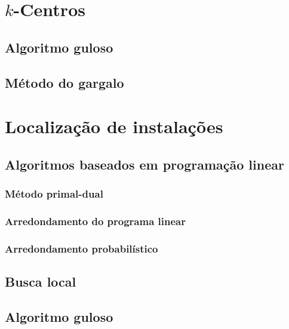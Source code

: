 \documentclass[12pt]{article}
\begin{document}
\section{$k$-Centros}
    

\subsection{Algoritmo guloso}
    

\subsection{Método do gargalo}
    

\section{Localização de instalações}
    

\subsection{Algoritmos baseados em programação linear}
    \label{facility:PL}
    

\subsubsection{Método primal-dual}
    

\subsubsection{Arredondamento do programa linear}
    

\subsubsection{Arredondamento probabilístico}
    

\subsection{Busca local}
    

\subsection{Algoritmo guloso}
    \label{facility:guloso&fitting}
    
\end{document}

